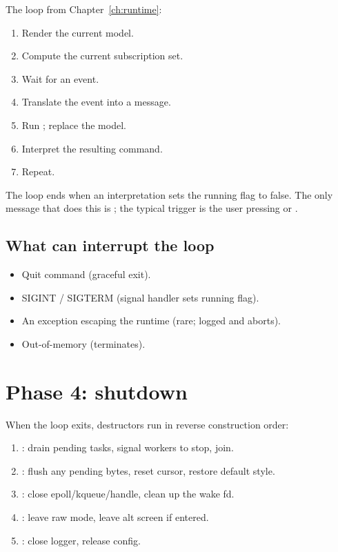 The loop from Chapter~\ref{ch:runtime}:

\begin{enumerate}[leftmargin=*]
  \item Render the current model.
  \item Compute the current subscription set.
  \item Wait for an event.
  \item Translate the event into a message.
  \item Run ; replace the model.
  \item Interpret the resulting command.
  \item Repeat.
\end{enumerate}

The loop ends when an interpretation sets the running flag to
false. The only message that does this is ; the
typical trigger is the user pressing  or .

\subsection*{What can interrupt the loop}

\begin{itemize}[leftmargin=*]
  \item Quit command (graceful exit).
  \item SIGINT / SIGTERM (signal handler sets running flag).
  \item An exception escaping the runtime (rare; logged and
    aborts).
  \item Out-of-memory (terminates).
\end{itemize}

\section{Phase 4: shutdown}

When the loop exits, destructors run in reverse construction
order:

\begin{enumerate}[leftmargin=*]
  \item {}: drain pending tasks, signal workers
    to stop, join.
  \item {}: flush any pending bytes, reset cursor,
    restore default style.
  \item {}: close epoll/kqueue/handle, clean up
    the wake fd.
  \item {}: leave raw mode, leave alt screen if
    entered.
  \item {}: close logger, release config.
\end{enumerate}

